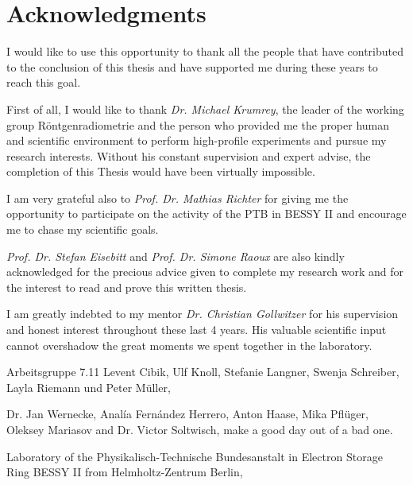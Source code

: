 \pagestyle{empty}
\noindent
\section*{Acknowledgments}

I would like to use this opportunity to thank all the people that have contributed to the conclusion of this thesis and have supported me during these years to reach this goal.
\vspace{2ex}

\noindent First of all, I would like to thank \emph{Dr. Michael Krumrey}, the leader of the working group Röntgenradiometrie and the person who provided me the proper human and scientific environment to perform high-profile experiments and pursue my research interests. Without his constant supervision and expert advise, the completion of this Thesis would have been virtually impossible.
\vspace{2ex}

\noindent I am very grateful also to \emph{Prof. Dr. Mathias Richter} for giving me the opportunity to participate on the activity of the PTB in BESSY II and encourage me to chase my scientific goals.
\vspace{2ex}

\noindent \emph{Prof. Dr. Stefan Eisebitt} and \emph{Prof. Dr. Simone Raoux} are also kindly acknowledged for the precious advice given to complete my research work and for the interest to read and prove this written thesis.
\vspace{2ex}

\noindent I am greatly indebted to my mentor \emph{Dr. Christian Gollwitzer} for his supervision and honest interest throughout these last 4 years. His valuable scientific input cannot overshadow the great moments we spent together in the laboratory.
\vspace{2ex}

\noindent Arbeitsgruppe 7.11 Levent Cibik, Ulf Knoll, Stefanie Langner, Swenja Schreiber, Layla Riemann und Peter Müller,
\vspace{2ex}

\noindent Dr. Jan Wernecke, Anal\'{i}a Fern\'{a}ndez Herrero, Anton Haase, Mika Pflüger, Oleksey Mariasov and Dr. Victor Soltwisch, make a good day out of a bad one. 
\vspace{2ex}

\noindent Laboratory of the Physikalisch-Technische Bundesanstalt in Electron Storage Ring BESSY II from Helmholtz-Zentrum Berlin,
\vspace{2ex}

